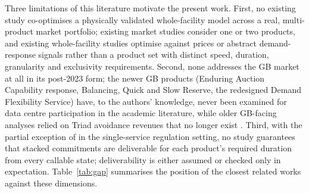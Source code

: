 \documentclass[lettersize,journal]{IEEEtran}
\begin{document}
Three limitations of this literature motivate the present work. First, no existing study co-optimises a physically validated whole-facility model across a real, multi-product market portfolio; existing market studies consider one or two products, and existing whole-facility studies optimise against prices or abstract demand-response signals rather than a product set with distinct speed, duration, granularity and exclusivity requirements. Second, none addresses the GB market at all in its post-2023 form; the newer GB products (Enduring Auction Capability response, Balancing, Quick and Slow Reserve, the redesigned Demand Flexibility Service) have, to the authors' knowledge, never been examined for data centre participation in the academic literature, while older GB-facing analyses relied on Triad avoidance revenues that no longer exist \cite{ofgem2019tcr}. Third, with the partial exception of \cite{fan2026harnessing} in the single-service regulation setting, no study guarantees that stacked commitments are deliverable for each product's required duration from every callable state; deliverability is either assumed or checked only in expectation. Table~\ref{tab:gap} summarises the position of the closest related works against these dimensions.
\end{document}
